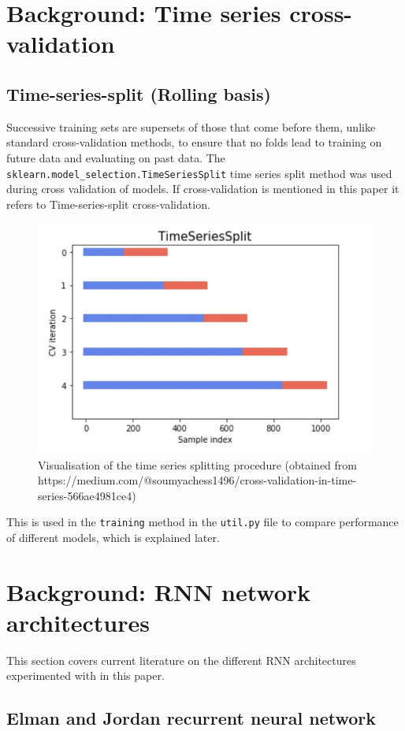 \documentclass[conference]{IEEEtran}
\begin{document}
\section{Background: Time series cross-validation}

\subsection{Time-series-split (Rolling basis)}

Successive training sets are supersets of those that come before them, unlike standard cross-validation methods, to ensure that no folds lead to training on future data and evaluating on past data. The \texttt{sklearn.model\_selection.TimeSeriesSplit} time series split method was used during cross validation of models. If cross-validation is mentioned in this paper it refers to Time-series-split cross-validation.

\begin{figure}[H] 
	\centering
	\includegraphics[width=0.7\linewidth]{../images/split.png}
	\caption{Visualisation of the time series splitting procedure (obtained from https://medium.com/@soumyachess1496/cross-validation-in-time-series-566ae4981ce4)}
	\label{fig:split}
\end{figure}

This is used in the \texttt{training} method in the \texttt{util.py} file to compare performance of different models, which is explained later.

\section{Background: RNN network architectures}

This section covers current literature on the different RNN architectures experimented with in this paper.

\subsection{Elman and Jordan recurrent neural network}
\end{document}
